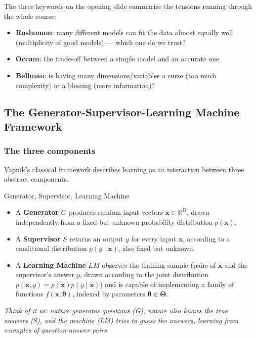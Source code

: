 The three keywords on the opening slide summarize the tensions running through the whole course:
\begin{itemize}
  \item \textbf{Rashomon}: many different models can fit the data almost equally well (multiplicity of good models) — which one do we trust?
  \item \textbf{Occam}: the trade-off between a simple model and an accurate one.
  \item \textbf{Bellman}: is having many dimensions/variables a curse (too much complexity) or a blessing (more information)?
\end{itemize}

\subsection{The Generator-Supervisor-Learning Machine Framework}\label{sec:rl-prolusion-gslm}

\subsubsection{The three components}

Vapnik's classical framework describes learning as an interaction between three abstract components.

\begin{defbox}{Generator, Supervisor, Learning Machine}
\begin{itemize}
  \item A \textbf{Generator} $G$ produces random input vectors $\mathbf{x} \in \mathbb{R}^D$, drawn independently from a fixed but unknown probability distribution $p(\mathbf{x})$.
  \item A \textbf{Supervisor} $S$ returns an output $y$ for every input $\mathbf{x}$, according to a conditional distribution $p(y \mid \mathbf{x})$, also fixed but unknown.
  \item A \textbf{Learning Machine} $LM$ observes the training sample (pairs of $\mathbf{x}$ and the supervisor's answer $y$, drawn according to the joint distribution $p(\mathbf{x}, y) = p(\mathbf{x}) p(y \mid \mathbf{x})$) and is capable of implementing a family of functions $f(\mathbf{x}, \boldsymbol\theta)$, indexed by parameters $\boldsymbol\theta \in \boldsymbol\Theta$.
\end{itemize}
\textit{Think of it as: nature generates questions (G), nature also knows the true answers (S), and the machine (LM) tries to guess the answers, learning from examples of question-answer pairs.}
\end{defbox}

